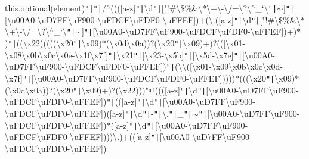 this.\+optional(element)\texttt{"|}\texttt{"|}/$^\wedge$((([a-\/z]\texttt{"|}\textbackslash{}d\texttt{"|}["!\#\textbackslash{}\$\%\&\textquotesingle{}\textbackslash{}$\ast$\textbackslash{}+\textbackslash{}-\/\textbackslash{}/=\textbackslash{}?\textbackslash{}$^\wedge$\+\_\+`\lcurly{}\textbackslash{}\texttt{"|}\rcurly{}$\sim$]\texttt{"|}[\textbackslash{}u00\+A0-\/\textbackslash{}u\+D7\+F\+F\textbackslash{}u\+F900-\/\textbackslash{}u\+F\+D\+C\+F\textbackslash{}u\+F\+D\+F0-\/\textbackslash{}u\+F\+F\+EF])+(\textbackslash{}.([a-\/z]\texttt{"|}\textbackslash{}d\texttt{"|}["!\#\textbackslash{}\$\%\&\textquotesingle{}\textbackslash{}$\ast$\textbackslash{}+\textbackslash{}-\/\textbackslash{}/=\textbackslash{}?\textbackslash{}$^\wedge$\+\_\+`\lcurly{}\textbackslash{}\texttt{"|}\rcurly{}$\sim$]\texttt{"|}[\textbackslash{}u00\+A0-\/\textbackslash{}u\+D7\+F\+F\textbackslash{}u\+F900-\/\textbackslash{}u\+F\+D\+C\+F\textbackslash{}u\+F\+D\+F0-\/\textbackslash{}u\+F\+F\+EF])+)$\ast$)\texttt{"|}((\textbackslash{}x22)((((\textbackslash{}x20\texttt{"|}\textbackslash{}x09)$\ast$(\textbackslash{}x0d\textbackslash{}x0a))?(\textbackslash{}x20\texttt{"|}\textbackslash{}x09)+)?(([\textbackslash{}x01-\/\textbackslash{}x08\textbackslash{}x0b\textbackslash{}x0c\textbackslash{}x0e-\/\textbackslash{}x1f\textbackslash{}x7f]\texttt{"|}\textbackslash{}x21\texttt{"|}[\textbackslash{}x23-\/\textbackslash{}x5b]\texttt{"|}[\textbackslash{}x5d-\/\textbackslash{}x7e]\texttt{"|}[\textbackslash{}u00\+A0-\/\textbackslash{}u\+D7\+F\+F\textbackslash{}u\+F900-\/\textbackslash{}u\+F\+D\+C\+F\textbackslash{}u\+F\+D\+F0-\/\textbackslash{}u\+F\+F\+EF])\texttt{"|}(\textbackslash{}\textbackslash{}([\textbackslash{}x01-\/\textbackslash{}x09\textbackslash{}x0b\textbackslash{}x0c\textbackslash{}x0d-\/\textbackslash{}x7f]\texttt{"|}[\textbackslash{}u00\+A0-\/\textbackslash{}u\+D7\+F\+F\textbackslash{}u\+F900-\/\textbackslash{}u\+F\+D\+C\+F\textbackslash{}u\+F\+D\+F0-\/\textbackslash{}u\+F\+F\+EF]))))$\ast$(((\textbackslash{}x20\texttt{"|}\textbackslash{}x09)$\ast$(\textbackslash{}x0d\textbackslash{}x0a))?(\textbackslash{}x20\texttt{"|}\textbackslash{}x09)+)?(\textbackslash{}x22)))"@((([a-\/z]\texttt{"|}\textbackslash{}d\texttt{"|}[\textbackslash{}u00\+A0-\/\textbackslash{}u\+D7\+F\+F\textbackslash{}u\+F900-\/\textbackslash{}u\+F\+D\+C\+F\textbackslash{}u\+F\+D\+F0-\/\textbackslash{}u\+F\+F\+EF])\texttt{"|}(([a-\/z]\texttt{"|}\textbackslash{}d\texttt{"|}[\textbackslash{}u00\+A0-\/\textbackslash{}u\+D7\+F\+F\textbackslash{}u\+F900-\/\textbackslash{}u\+F\+D\+C\+F\textbackslash{}u\+F\+D\+F0-\/\textbackslash{}u\+F\+F\+EF])([a-\/z]\texttt{"|}\textbackslash{}d\texttt{"|}-\/\texttt{"|}\textbackslash{}.\texttt{"|}\+\_\+\texttt{"|}$\sim$\texttt{"|}[\textbackslash{}u00\+A0-\/\textbackslash{}u\+D7\+F\+F\textbackslash{}u\+F900-\/\textbackslash{}u\+F\+D\+C\+F\textbackslash{}u\+F\+D\+F0-\/\textbackslash{}u\+F\+F\+EF])$\ast$([a-\/z]\texttt{"|}\textbackslash{}d\texttt{"|}[\textbackslash{}u00\+A0-\/\textbackslash{}u\+D7\+F\+F\textbackslash{}u\+F900-\/\textbackslash{}u\+F\+D\+C\+F\textbackslash{}u\+F\+D\+F0-\/\textbackslash{}u\+F\+F\+EF])))\textbackslash{}.)+(([a-\/z]\texttt{"|}[\textbackslash{}u00\+A0-\/\textbackslash{}u\+D7\+F\+F\textbackslash{}u\+F900-\/\textbackslash{}u\+F\+D\+C\+F\textbackslash{}u\+F\+D\+F0-\/\textbackslash{}u\+F\+F\+EF])\text